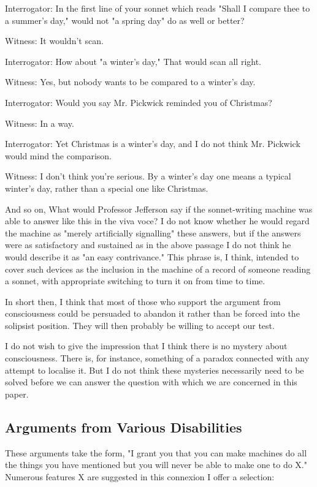 \documentclass{article}
\begin{document}
Interrogator: In the first line of your sonnet which reads "Shall I compare thee to a summer's day," would not "a spring day" do as well or better?

Witness: It wouldn't scan.

Interrogator: How about "a winter's day," That would scan all right.

Witness: Yes, but nobody wants to be compared to a winter's day.

Interrogator: Would you say Mr. Pickwick reminded you of Christmas?

Witness: In a way.

Interrogator: Yet Christmas is a winter's day, and I do not think Mr. Pickwick would mind the comparison.

Witness: I don't think you're serious. By a winter's day one means a typical winter's day, rather than a special one like Christmas.

And so on, What would Professor Jefferson say if the sonnet-writing machine was able to answer like this in the viva voce? I do not know whether he would regard the machine as "merely artificially signalling" these answers, but if the answers were as satisfactory and sustained as in the above passage I do not think he would describe it as "an easy contrivance." This phrase is, I think, intended to cover such devices as the inclusion in the machine of a record of someone reading a sonnet, with appropriate switching to turn it on from time to time.

In short then, I think that most of those who support the argument from consciousness could be persuaded to abandon it rather than be forced into the solipsist position. They will then probably be willing to accept our test.

I do not wish to give the impression that I think there is no mystery about consciousness. There is, for instance, something of a paradox connected with any attempt to localise it. But I do not think these mysteries necessarily need to be solved before we can answer the question with which we are concerned in this paper.


\subsection{Arguments from Various Disabilities}

These arguments take the form, "I grant you that you can make machines do all the things you have mentioned but you will never be able to make one to do X." Numerous features X are suggested in this connexion I offer a selection:
\end{document}
